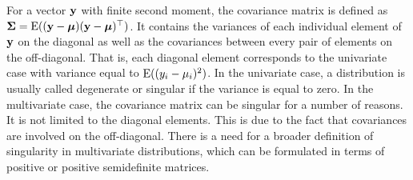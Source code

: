 \documentclass[12pt, twoside]{book}\usepackage{knitr}
\begin{document}
For a vector $\mathbf{y}$ with finite second moment, the covariance matrix is defined as $\mathbf{\Sigma}=\operatorname{E}((\mathbf{y} - \mbox{\boldmath$\mu$})(\mathbf{y} - \mbox{\boldmath$\mu$})^\top)$. 
It contains the variances of each individual element of $\mathbf{y}$ on the diagonal as well as the covariances between every pair of elements on the off-diagonal. 
That is, each diagonal element corresponds to the univariate case with variance equal to $\operatorname{E}((y_i - \mu_i)^2)$. 
In the univariate case, a distribution is usually called degenerate or singular if the variance is equal to zero. 
In the multivariate case, the covariance matrix can be singular for a number of reasons. 
It is not limited to the diagonal elements.
This is due to the fact that covariances are involved on the off-diagonal.
There is a need for a broader definition of singularity in multivariate distributions, which can be formulated in terms of positive or positive semidefinite matrices. 
\end{document}
